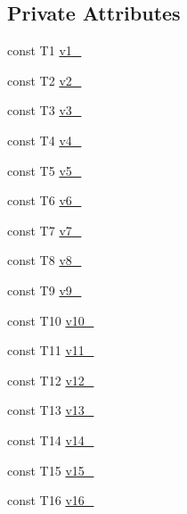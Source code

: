 \subsection*{Private Attributes}
\begin{DoxyCompactItemize}
\item 
const T1 \mbox{\hyperlink{classtesting_1_1internal_1_1_value_array16_a3b2f8d0e05aa8cbd4839a0ac67abdba8}{v1\+\_\+}}
\item 
const T2 \mbox{\hyperlink{classtesting_1_1internal_1_1_value_array16_aacbcb8e3a3afcc6d030b55e212a1efa3}{v2\+\_\+}}
\item 
const T3 \mbox{\hyperlink{classtesting_1_1internal_1_1_value_array16_a626cca5cf5a81163cde24acbfc70337e}{v3\+\_\+}}
\item 
const T4 \mbox{\hyperlink{classtesting_1_1internal_1_1_value_array16_aab7669f572368343bf468ce3caa37085}{v4\+\_\+}}
\item 
const T5 \mbox{\hyperlink{classtesting_1_1internal_1_1_value_array16_adadc9d6e052115ad04594742fc57a5f5}{v5\+\_\+}}
\item 
const T6 \mbox{\hyperlink{classtesting_1_1internal_1_1_value_array16_a4fb569cfe47d94897dc147de0b55f4a5}{v6\+\_\+}}
\item 
const T7 \mbox{\hyperlink{classtesting_1_1internal_1_1_value_array16_a33f694db86e28016da8ee34897535205}{v7\+\_\+}}
\item 
const T8 \mbox{\hyperlink{classtesting_1_1internal_1_1_value_array16_adec5c4a3855517e545a0aab767c2558d}{v8\+\_\+}}
\item 
const T9 \mbox{\hyperlink{classtesting_1_1internal_1_1_value_array16_a8e54e387a861d52c658b2b1055566a98}{v9\+\_\+}}
\item 
const T10 \mbox{\hyperlink{classtesting_1_1internal_1_1_value_array16_ab50ecbf6f6567fee7419ca49507ebe26}{v10\+\_\+}}
\item 
const T11 \mbox{\hyperlink{classtesting_1_1internal_1_1_value_array16_a2cf8e91cb714d0d2c29c2525472d5426}{v11\+\_\+}}
\item 
const T12 \mbox{\hyperlink{classtesting_1_1internal_1_1_value_array16_a80da16885f51e75c5121dabf0f83d031}{v12\+\_\+}}
\item 
const T13 \mbox{\hyperlink{classtesting_1_1internal_1_1_value_array16_a6f0902934eedbfdf640148603a8b06a9}{v13\+\_\+}}
\item 
const T14 \mbox{\hyperlink{classtesting_1_1internal_1_1_value_array16_a48c73da44c4932f1c91b423efebe050d}{v14\+\_\+}}
\item 
const T15 \mbox{\hyperlink{classtesting_1_1internal_1_1_value_array16_a8f81a78c148cd0527fb25eaa92d02b42}{v15\+\_\+}}
\item 
const T16 \mbox{\hyperlink{classtesting_1_1internal_1_1_value_array16_a8df7ec6faa3bae29d6deb2baf457da6e}{v16\+\_\+}}
\end{DoxyCompactItemize}


